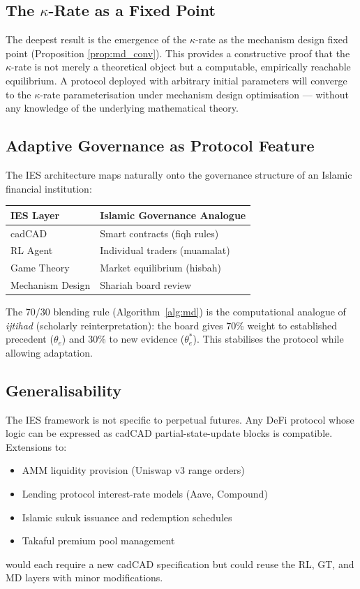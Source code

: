 \documentclass[10pt,twocolumn]{article}
\theoremstyle{plain}
\theoremstyle{definition}
\begin{document}
\subsection{The $\kappa$-Rate as a Fixed Point}

The deepest result is the emergence of the $\kappa$-rate
as the mechanism design fixed point (Proposition
\ref{prop:md_conv}).  This provides a constructive
proof that the $\kappa$-rate is not merely a theoretical
object but a computable, empirically reachable equilibrium.
A protocol deployed with arbitrary initial parameters
will converge to the $\kappa$-rate parameterisation
under mechanism design optimisation --- without any
knowledge of the underlying mathematical theory.

\subsection{Adaptive Governance as Protocol Feature}

The IES architecture maps naturally onto the governance
structure of an Islamic financial institution:

\begin{center}
\begin{tabular}{ll}
\toprule
IES Layer & Islamic Governance Analogue \\
\midrule
cadCAD & Smart contracts (fiqh rules) \\
RL Agent & Individual traders (muamalat) \\
Game Theory & Market equilibrium (hisbah) \\
Mechanism Design & Shariah board review \\
\bottomrule
\end{tabular}
\end{center}

The 70/30 blending rule (Algorithm~\ref{alg:md}) is
the computational analogue of \textit{ijtihad} (scholarly
reinterpretation): the board gives 70\% weight to established
precedent ($\theta_e$) and 30\% to new evidence ($\theta^*_e$).
This stabilises the protocol while allowing adaptation.

\subsection{Generalisability}

The IES framework is not specific to perpetual futures.
Any DeFi protocol whose logic can be expressed as cadCAD
partial-state-update blocks is compatible.  Extensions to:
\begin{itemize}[leftmargin=*,noitemsep]
\item AMM liquidity provision (Uniswap v3 range orders)
\item Lending protocol interest-rate models (Aave, Compound)
\item Islamic sukuk issuance and redemption schedules
\item Takaful premium pool management
\end{itemize}
would each require a new cadCAD specification but could
reuse the RL, GT, and MD layers with minor modifications.
\end{document}
